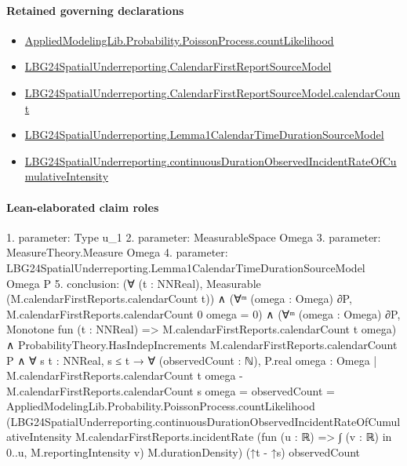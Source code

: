 \documentclass[10pt]{article}
\begin{document}
\paragraph{Retained governing declarations}
\begin{itemize}\raggedright
\item \hyperlink{governing-declaration-2868a964549830a8}{Applied\allowbreak{}Modeling\allowbreak{}Lib.\allowbreak{}Probability.\allowbreak{}Poisson\allowbreak{}Process.\allowbreak{}count\allowbreak{}Likelihood}
\item \hyperlink{paper-prerequisite-8b45cca115cdd2d8}{LBG24\allowbreak{}Spatial\allowbreak{}Underreporting.\allowbreak{}Calendar\allowbreak{}First\allowbreak{}Report\allowbreak{}Source\allowbreak{}Model}
\item \hyperlink{governing-declaration-2cd146635f1d1568}{LBG24\allowbreak{}Spatial\allowbreak{}Underreporting.\allowbreak{}Calendar\allowbreak{}First\allowbreak{}Report\allowbreak{}Source\allowbreak{}Model.\allowbreak{}calendar\allowbreak{}Count}
\item \hyperlink{paper-prerequisite-c4bb9830feab9643}{LBG24\allowbreak{}Spatial\allowbreak{}Underreporting.\allowbreak{}Lemma1\allowbreak{}Calendar\allowbreak{}Time\allowbreak{}Duration\allowbreak{}Source\allowbreak{}Model}
\item \hyperlink{governing-declaration-a82cc646272dff75}{LBG24\allowbreak{}Spatial\allowbreak{}Underreporting.\allowbreak{}continuous\allowbreak{}Duration\allowbreak{}Observed\allowbreak{}Incident\allowbreak{}Rate\allowbreak{}Of\allowbreak{}Cumulative\allowbreak{}Intensity}
\end{itemize}
\paragraph{Lean-elaborated claim roles}\begin{ReviewVerbatim}
1. parameter: Type u_1
2. parameter: MeasurableSpace Omega
3. parameter: MeasureTheory.Measure Omega
4. parameter: LBG24SpatialUnderreporting.Lemma1CalendarTimeDurationSourceModel Omega P
5. conclusion: (∀ (t : NNReal), Measurable (M.calendarFirstReports.calendarCount t)) ∧
  (∀ᵐ (omega : Omega) ∂P, M.calendarFirstReports.calendarCount 0 omega = 0) ∧
    (∀ᵐ (omega : Omega) ∂P, Monotone fun (t : NNReal) => M.calendarFirstReports.calendarCount t omega) ∧
      ProbabilityTheory.HasIndepIncrements M.calendarFirstReports.calendarCount P ∧
        ∀ {s t : NNReal},
          s ≤ t →
            ∀ (observedCount : ℕ),
              P.real
                  {omega : Omega |
                    M.calendarFirstReports.calendarCount t omega - M.calendarFirstReports.calendarCount s omega =
                      observedCount} =
                AppliedModelingLib.Probability.PoissonProcess.countLikelihood
                  (LBG24SpatialUnderreporting.continuousDurationObservedIncidentRateOfCumulativeIntensity
                    M.calendarFirstReports.incidentRate (fun (u : ℝ) => ∫ (v : ℝ) in 0..u, M.reportingIntensity v)
                    M.durationDensity)
                  (↑t - ↑s) observedCount
\end{ReviewVerbatim}
\end{document}
